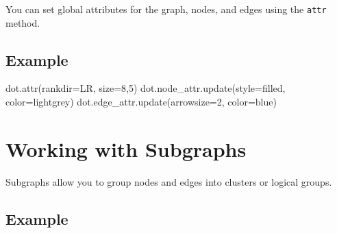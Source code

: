 \documentclass[
  letterpaper,
  DIV=11,
  numbers=noendperiod]{scrreprt}
\newenvironment{Shaded}{\begin{snugshade}}{\end{snugshade}}
\newcommand{\NormalTok}[1]{\textcolor[rgb]{0.00,0.23,0.31}{#1}}
\newcommand{\OperatorTok}[1]{\textcolor[rgb]{0.37,0.37,0.37}{#1}}
\newcommand{\StringTok}[1]{\textcolor[rgb]{0.13,0.47,0.30}{#1}}
\begin{document}
You can set global attributes for the graph, nodes, and edges using the
\texttt{attr} method.

\subsection{Example}\label{example-46}

\begin{Shaded}
\begin{Highlighting}[]
\NormalTok{dot.attr(rankdir}\OperatorTok{=}\StringTok{\textquotesingle{}LR\textquotesingle{}}\NormalTok{, size}\OperatorTok{=}\StringTok{\textquotesingle{}8,5\textquotesingle{}}\NormalTok{)}
\NormalTok{dot.node\_attr.update(style}\OperatorTok{=}\StringTok{\textquotesingle{}filled\textquotesingle{}}\NormalTok{, color}\OperatorTok{=}\StringTok{\textquotesingle{}lightgrey\textquotesingle{}}\NormalTok{)}
\NormalTok{dot.edge\_attr.update(arrowsize}\OperatorTok{=}\StringTok{\textquotesingle{}2\textquotesingle{}}\NormalTok{, color}\OperatorTok{=}\StringTok{\textquotesingle{}blue\textquotesingle{}}\NormalTok{)}
\end{Highlighting}
\end{Shaded}

\section{Working with Subgraphs}\label{working-with-subgraphs}

Subgraphs allow you to group nodes and edges into clusters or logical
groups.

\subsection{Example}\label{example-47}
\end{document}
